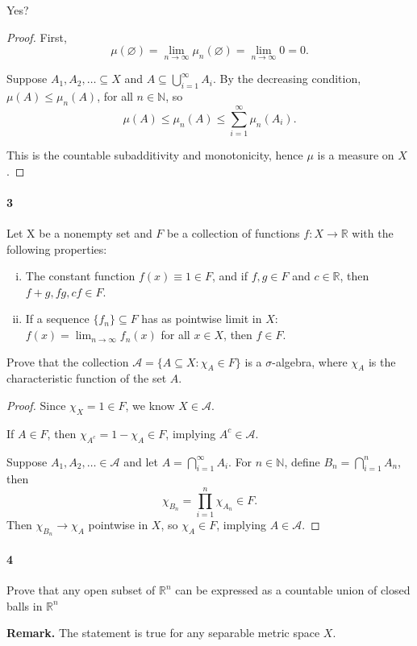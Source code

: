 \documentclass[12pt]{article}
\newlength{\myparskip}
\newenvironment{fullbox}{\begin{lrbox}{\savefullbox}\begin{minipage}{\dimexpr\textwidth-2\fboxsep\relax}\setlength{\parskip}{\myparskip}}{\end{minipage}\end{lrbox}\framebox[\textwidth]{\usebox{\savefullbox}}}
\newenvironment{pbox}[1][]{\begin{fullbox}\ifx#1\empty\else\paragraph{#1}\fi}{\end{fullbox}}
\newcommand{\N}{\mathbb{N}}
\newcommand{\R}{\mathbb{R}}
\renewcommand{\emptyset}{\varnothing}
\newcommand{\<}{\langle}
\renewcommand{\>}{\rangle}
\renewcommand{\AA}{\mathcal{A}}
\begin{document}
Yes?

\begin{proof}
    First,
    \[
        \mu(\emptyset)
            = \lim_{n \to \infty} \mu_n(\emptyset)
            = \lim_{n \to \infty} 0
            = 0.
    \]
    

    Suppose $A_1, A_2, \ldots \subseteq X$ and $A \subseteq \bigcup_{i=1}^{\infty} A_i$. By the decreasing condition, $\mu(A) \leq \mu_n(A)$, for all $n \in \N$, so
    \[
        \mu(A)
            \leq \mu_n(A)
            \leq \sum_{i=1}^{\infty} \mu_n(A_i).
    \]
    


    This is the countable subadditivity and monotonicity, hence $\mu$ is a measure on $X$.

\end{proof}


\newpage
\begin{pbox}[3]
    Let X be a nonempty set and $F$ be a collection of functions $f : X \to \R$ with the following properties:
    \begin{enumerate}[(i)]
        \item The constant function $f(x) \equiv 1 \in F$, and if $f, g \in F$ and $c \in \R$, then $f + g, fg, cf \in F$.
        \item If a sequence $\{f_n\} \subseteq F$ has as pointwise limit in $X$: $f(x) = \lim_{n \to \infty} f_n(x)$ for all $x \in X$, then $f \in F$.
    \end{enumerate}
    Prove that the collection $\AA = \{A \subseteq X : \chi_A \in F\}$ is a $\sigma$-algebra, where $\chi_A$ is the characteristic function of the set $A$.
\end{pbox}

\begin{proof}
    Since $\chi_X = 1 \in F$, we know $X \in \AA$.

    If $A \in F$, then $\chi_{A^c} = 1 - \chi_A \in F$, implying $A^c \in \AA$.

    Suppose $A_1, A_2, \ldots \in \AA$ and let $A = \bigcap_{i=1}^{\infty} A_i$. For $n \in \N$, define $B_n = \bigcap_{i=1}^{n} A_n$, then
    \[
        \chi_{B_n} = \prod_{i=1}^{n} \chi_{A_n} \in F.
    \]
    Then $\chi_{B_n} \to \chi_A$ pointwise in $X$, so $\chi_A \in F$, implying $A \in \AA$.

\end{proof}


\newpage
\begin{pbox}[4]
    Prove that any open subset of $\R^n$ can be expressed as a countable union of closed balls in $\R^n$

    \textbf{Remark.} The statement is true for any separable metric space $X$.
\end{pbox}
\end{document}
